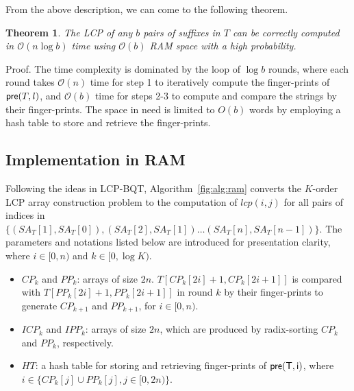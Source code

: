 \documentclass{llncs}
\newtheorem{thm}{Theorem}
\begin{document}
From the above description, we can come to the following theorem.
\begin{thm}
\label{thm:lcp:naive}
The {LCP} of any $b$ pairs of suffixes in $T$ can be correctly computed in $\mathcal{O}(n\log b)$ time using $\mathcal{O}(b)$ {RAM} space with a high probability.
\end{thm}
Proof. The time complexity is dominated by the loop of $\log b$ rounds, where each round takes $\mathcal{O}(n)$ time for step 1 to iteratively compute the finger-prints of ${\sf pre}(T,l)$, and $\mathcal{O}(b)$ time for steps 2-3 to compute and compare the strings by their finger-prints. The space in need is limited to $O(b)$ words by employing a hash table to store and retrieve the finger-prints.


\subsection{Implementation in RAM}\label{subsec:implementation_in_ram}

Following the ideas in {LCP-BQT}, Algorithm~\ref{fig:alg:ram} converts the $K$-order {LCP} array construction problem to the computation of $lcp(i,j)$ for all pairs of indices in $\{(SA_T[1], SA_T[0]),(SA_T[2], SA_T[1])\ldots (SA_T[n], SA_T[n-1])\}$. The parameters and notations listed below are introduced for presentation clarity, where $i\in [0,n)$ and $k\in [0,\log K)$.

\begin{itemize}
\item $CP_k$ and $PP_k$: arrays of size $2n$. $T[CP_k[2i]+1,CP_k[2i+1]]$ is compared with $T[PP_k[2i]+1,PP_k[2i+1]]$ in round $k$ by their finger-prints to generate $CP_{k+1}$ and $PP_{k+1}$, for $i\in [0,n)$.
\item $ICP_k$ and $IPP_k$: arrays of size $2n$, which are produced by radix-sorting $CP_k$ and $PP_k$, respectively.
\item $HT$: a hash table for storing and retrieving finger-prints of ${\sf pre(T,i)}$, where $i\in \{CP_k[j] \cup PP_k[j], j\in[0,2n)\}$.
\end{itemize}
\end{document}
